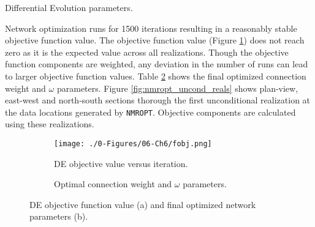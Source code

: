 \begin{table}[!htb]
    \centering
    \caption{Differential Evolution parameters.}
    \resizebox{0.9\width}{!}{}
    \label{tab:de_params}
\end{table}

Network optimization runs for 1500 iterations resulting in a reasonably stable objective function value. The objective function value (Figure \ref{fig:fobj}) does not reach zero as it is the expected value across all realizations. Though the objective function components are weighted, any deviation in the number of runs can lead to larger objective function values. Table \ref{tab:opt_omega} shows the final optimized connection weight and  $\omega$ parameters. Figure \ref{fig:nmropt_uncond_reals} shows plan-view, east-west and north-south sections thorough the first unconditional realization at the data locations generated by \texttt{NMROPT}. Objective components are calculated using these realizations.



\begin{figure}
    \begin{subfigure}[c]{0.5\textwidth}
        \centering
        \texttt{[image: ./0-Figures/06-Ch6/fobj.png]}
        \caption{\Gls{DE} objective value versus iteration.}
        \label{fig:fobj}
    \end{subfigure}
    \begin{subfigure}[c]{0.5\textwidth}
        \centering
        \resizebox{0.9\width}{!}{}
        \caption{Optimal connection weight and $\omega$ parameters.}
        \label{tab:opt_omega}
    \end{subfigure}
    \caption{\Gls{DE} objective function value (a) and final optimized network parameters (b).}
    \label{}
\end{figure}


